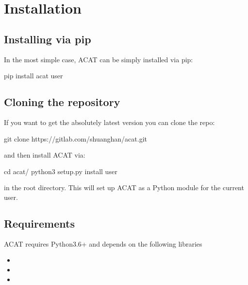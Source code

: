 \documentclass[letterpaper,10pt,english]{sphinxmanual}
\begin{document}
\section{Installation}
\label{\detokenize{installation:index-0}}\label{\detokenize{installation:id1}}\label{\detokenize{installation::doc}}

\subsection{Installing via pip}
\label{\detokenize{installation:installing-via-pip}}
In the most simple case, ACAT can be simply installed
via pip:

\begin{sphinxVerbatim}[commandchars=\\\{\}]
\PYGZdl{} pip install acat \PYGZhy{}\PYGZhy{}user
\end{sphinxVerbatim}


\subsection{Cloning the repository}
\label{\detokenize{installation:cloning-the-repository}}
If you want to get the absolutely latest version you can clone the
repo:

\begin{sphinxVerbatim}[commandchars=\\\{\}]
\PYGZdl{} git clone https://gitlab.com/shuanghan/acat.git
\end{sphinxVerbatim}

and then install ACAT via:

\begin{sphinxVerbatim}[commandchars=\\\{\}]
\PYGZdl{} cd acat/
\PYGZdl{} python3 setup.py install \PYGZhy{}\PYGZhy{}user
\end{sphinxVerbatim}

in the root directory. This will set up ACAT as a Python module
for the current user.


\subsection{Requirements}
\label{\detokenize{installation:requirements}}
ACAT requires Python3.6+ and depends on the following libraries
\begin{itemize}
\item {} 

\item {} 

\item {} 

\end{itemize}
\end{document}
